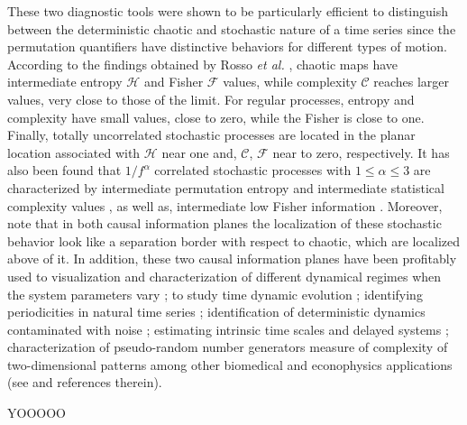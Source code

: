 These two diagnostic tools were shown to be particularly efficient to distinguish between the deterministic 
chaotic and stochastic nature of a time series since the permutation quantifiers have distinctive behaviors 
for different types of motion.
According to the findings obtained by Rosso {\it et al.\/} \cite{Rosso2007,Olivares2012B,Rosso2015PP}, 
chaotic maps have intermediate entropy ${\mathcal H}$ and Fisher ${\mathcal F}$ values, while complexity 
${\mathcal C}$ reaches larger values, very close to those of the limit. 
For regular processes, entropy and complexity have small values, close to zero, while the Fisher is close
to one. 
Finally, totally uncorrelated stochastic processes are located in the planar location associated with
${\mathcal H}$ near one and, ${\mathcal C}$, ${\mathcal F}$ near to zero, respectively.
It has also been found that $1/f^\alpha$ correlated stochastic processes with $1 \leq \alpha \leq 3$ are 
characterized by intermediate permutation entropy and intermediate statistical complexity values
\cite{Rosso2007}, as well as,  intermediate low Fisher information \cite{Rosso2007,Olivares2012B,Rosso2015PP}.
Moreover, note that in both causal information planes the localization of these stochastic behavior look like 
a separation border with respect to chaotic, which are localized above of it.
In addition, these two causal information planes have been profitably used to visualization and characterization 
of different dynamical regimes when the system parameters vary  
\cite{Olivares2012A,Olivares2012B,Rosso2010,Kowalski2011,DeMicco2012,Lange2013,Serinaldi2014,Montani2014A,Montani2014B,Montani2015A,Montani2015B}; 
to study time dynamic evolution 
\cite{Kowalski2007,Bariviera2015A,Bariviera2015B};
identifying periodicities in natural time series 
\cite{Bandt2005};
identification of deterministic dynamics contaminated with noise 
\cite{Rosso2012A,Rosso2012B};
estimating intrinsic time scales and delayed systems 
\cite{Zunino2010B,Soriano2011,Zunino2012,Aquino2015};
characterization of pseudo-random number generators
\cite{Demico2008,Demico2012}
measure of complexity of two-dimensional patterns
\cite{Ribeiro2012}
among other biomedical and econophysics applications (see \cite{Zanin2012} and references therein).

YOOOOO

